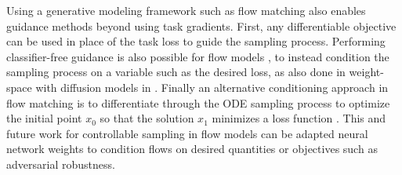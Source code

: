 Using a generative modeling framework such as flow matching also enables guidance methods beyond using task gradients. First, any differentiable objective can be used in place of the task loss to guide the sampling process. Performing classifier-free guidance is also possible for flow models \citep{zhengGuidedFlowsGenerative2023}, to instead condition the sampling process on a variable such as the desired loss, as also done in weight-space with diffusion models in \citet{peeblesLearningLearnGenerative2022}. Finally an alternative conditioning approach in flow matching is to differentiate through the ODE sampling process to optimize the initial point $x_0$ so that the solution $x_1$ minimizes a loss function \citep{ben-hamuDFlowDifferentiatingFlows2024}. This and future work for controllable sampling in flow models can be adapted neural network weights to condition flows on desired quantities or objectives such as adversarial robustness. 
